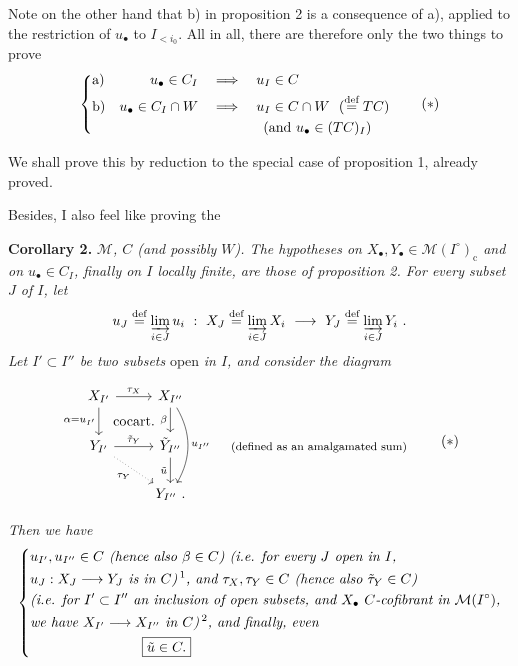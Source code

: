 \documentclass[11pt]{article}
\newcommand{\printedpage}[1]{\marginpar{\footnotesize p.~#1}}
\newcommand{\msp}[1]{\marginpar{\footnotesize [#1]}}
\newcommand{\defeq}{\overset{\textup{def}}{=}}
\newcommand{\cocart}{\textup{cocart.}}
\begin{document}
Note on the other hand that b) in proposition 2 is a consequence of a), applied to the restriction of $u_{\bullet}$ to $I_{<i_0}$. All in all, there are therefore only the two things to prove
\[
\left\{
\begin{aligned}
&\text{a)} & u_{\bullet} \in C_I &\quad\Longrightarrow\quad u_I \in C \\
&\text{b)} & u_{\bullet} \in C_I \cap W &\quad\Longrightarrow\quad u_I \in C \cap W\ \ (\defeq TC) \\
& & &\qquad\qquad\ \ (\text{and } u_{\bullet} \in (TC)_I)
\end{aligned}
\right.
\tag*{$(*)$}
\]

We shall prove this by reduction to the special case of proposition 1, already proved.

Besides, I also feel like proving the

\textbf{Corollary 2.} \textit{$\mathcal{M}$, $C$ (and possibly $W$). The hypotheses on $X_{\bullet}, Y_{\bullet} \in \mathcal{M}(I^{\circ})_{\mathrm{c}}$ and on $u_{\bullet} \in C_I$, finally on $I$ locally finite, are those of proposition 2. For every subset $J$ of $I$, let}
\[
u_J \defeq \varinjlim_{i \in J} u_i \ :\ X_J \defeq \varinjlim_{i \in J} X_i \ \longrightarrow\ Y_J \defeq \varinjlim_{i \in J} Y_i\ .
\]
\textit{Let $I' \subset I''$ be two subsets} open \textit{in $I$, and consider the diagram}

\msp{page 10}

\[
\begin{tikzcd}
X_{I'} \arrow[r, "\tau_X"] \arrow[d, "\alpha = u_{I'}"'] \arrow[dr, phantom, "\cocart"] & X_{I''} \arrow[d, "\beta"'] \arrow[dd, bend left=30, "u_{I''}"] & \\
Y_{I'} \arrow[r, "\tilde{\tau}_Y"] \arrow[dr, dotted, "\tau_Y"'] & \tilde{Y}_{I''} \arrow[d, "\tilde{u}"'] & \text{\footnotesize (defined as an amalgamated sum)} \\
& Y_{I''}\ . &
\end{tikzcd}
\tag*{$(*)$}
\]

\printedpage{6}

\textit{Then we have}
\[
\left\{
\begin{aligned}
&\textit{$u_{I'}, u_{I''} \in C$ (hence also $\beta \in C$) (i.e. for every $J$ open in $I$,}\\
&\textit{$u_J : X_J \longrightarrow Y_J$ is in $C$)\,\footnotemark, and $\tau_X, \tau_Y \in C$ (hence also $\tilde{\tau}_Y \in C$)}\\
&\textit{(i.e. for $I' \subset I''$ an inclusion of open subsets, and $X_{\bullet}$ $C$-cofibrant in $\mathcal{M}(I^{\circ})$,}\\
&\textit{we have $X_{I'} \longrightarrow X_{I''}$ in $C$)\,\footnotemark, and finally, even}\\
&\qquad\qquad\qquad\qquad\boxed{\tilde{u} \in C.}
\end{aligned}
\right.
\]
\addtocounter{footnote}{-1}
\end{document}
